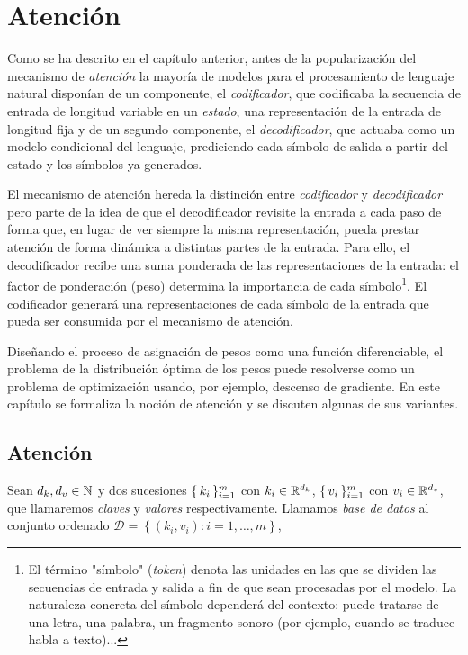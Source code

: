 \chapter{Atención}
Como se ha descrito en el capítulo anterior, antes de la popularización del mecanismo de \textit{atención} la mayoría de modelos para el procesamiento de lenguaje natural disponían de un componente, el \textit{codificador}, que codificaba la secuencia de entrada de longitud variable en un \textit{estado}, una representación de la entrada de longitud fija y de un segundo componente, el \textit{decodificador}, que actuaba como un modelo condicional del lenguaje, prediciendo cada símbolo de salida a partir del estado y los símbolos ya generados.

El mecanismo de atención hereda la distinción entre \textit{codificador} y \textit{decodificador} pero parte de la idea de que el decodificador revisite la entrada a cada paso de forma que, en lugar de ver siempre la misma representación, pueda prestar atención de forma dinámica a distintas partes de la entrada. Para ello, el decodificador recibe una suma ponderada de las representaciones de la entrada: el factor de ponderación (peso) determina la importancia de cada símbolo\footnote{El término "símbolo" (\textit{token}) denota las unidades en las que se dividen las secuencias de entrada y salida a fin de que sean procesadas por el modelo. La naturaleza concreta del símbolo dependerá del contexto: puede tratarse de una letra, una palabra, un fragmento sonoro (por ejemplo, cuando se traduce habla a texto)... }. El codificador generará una representaciones de cada símbolo de la entrada que pueda ser consumida por el mecanismo de atención.

Diseñando el proceso de asignación de pesos como una función diferenciable, el problema de la distribución óptima de los pesos puede resolverse como un problema de optimización usando, por ejemplo, descenso de gradiente. En este capítulo se formaliza la noción de atención y se discuten algunas de sus variantes.

\section{Atención}

\begin{definition}
    Sean \( d_k, d_v \in \mathbb{N} \) y dos sucesiones \( \{\, k_i \,\}_{i = 1}^m \) con \( k_i \in \mathbb{R}^{d_k} \), \( \{\,v_i\,\}_{i = 1}^m \) con  \( v_ i \in \mathbb{R}^{d_v} \), que llamaremos \textit{claves} y \textit{valores} respectivamente. Llamamos \textit{base de datos} al conjunto ordenado \( \mathcal{D} = \left\{ (k_i, v_i) \colon i = 1, …, m \right\} \),
\end{definition}

